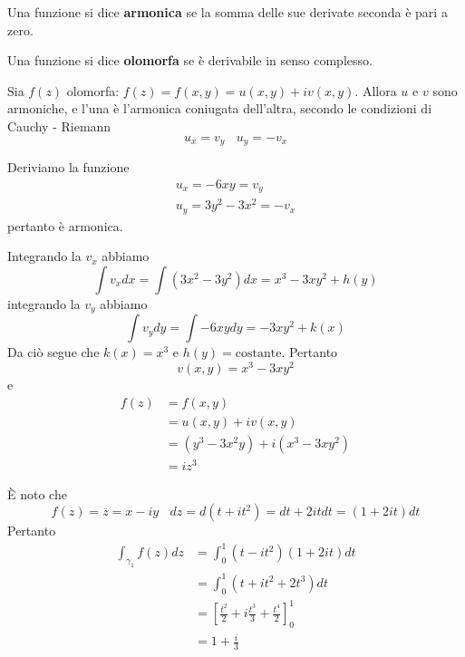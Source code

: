 \Soluzione

\begin{defn}
Una funzione si dice \textbf{armonica} se la somma delle sue derivate seconda è pari a zero.
\end{defn}
\begin{defn}
Una funzione si dice \textbf{olomorfa} se è derivabile in senso complesso.
\end{defn}
\begin{thm}
Sia $f(z)$ olomorfa: $f(z) = f(x, y) = u(x, y) + iv(x, y)$. Allora $u$ e $v$ sono armoniche, e l'una è l'armonica coniugata dell'altra, secondo le condizioni di Cauchy - Riemann
\begin{equation*}
u_{x} = v_{y} \ \ \ \ u_{y} = - v_{x}
\end{equation*}
\end{thm}
Deriviamo la funzione
\begin{gather*}
u_{x} = - 6xy = v_{y}\\
u_{y} = 3y^{2} - 3x^{2} = - v_{x}
\end{gather*}
pertanto è armonica.

Integrando la $v_{x}$ abbiamo
\begin{equation*}
\int v_{x} dx = \int \left(3x^{2} - 3y^{2}\right) dx = x^{3} - 3xy^{2} + h(y)
\end{equation*}
integrando la $v_{y}$ abbiamo
\begin{equation*}
\int v_{y} dy = \int - 6xydy = -3xy^{2} + k(x)
\end{equation*}
Da ciò segue che $k(x) = x^{3}$ e $h(y) = \text{costante}$. Pertanto
\begin{equation*}
v(x, y) = x^{3} - 3xy^{2}
\end{equation*}
e
\begin{align*}
f(z) & = f(x, y)\\
 & = u(x, y) + iv(x, y)\\
 & = \left(y^{3} - 3x^{2} y\right) + i\left(x^{3} - 3xy^{2}\right)\\
 & = iz^{3}
\end{align*}

\Soluzione

È noto che
\begin{equation*}
f(z) = \overline{z} = x - iy\ \ \ \ dz = d\left(t + it^{2}\right) = dt + 2itdt = \left(1 + 2it\right) dt
\end{equation*}
Pertanto
\begin{align*}
\int_{\gamma_{1}} f(z)dz & = \int^{1}_{0}\left(t - it^{2}\right) (1 + 2it)dt\\
 & = \int^{1}_{0}\left(t + it^{2} + 2t^{3}\right) dt\\
 & = \left[\frac{t^{2}}{2} + i\frac{t^{3}}{3} + \frac{t^{4}}{2}\right]^{1}_{0}\\
 & = 1 + \frac{i}{3}
\end{align*}

